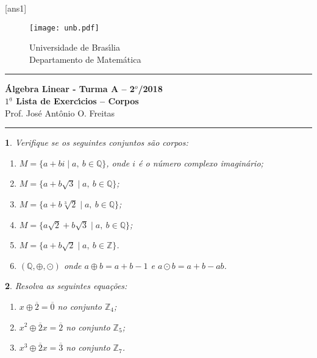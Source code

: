 \documentclass[12pt]{exam}
\newtheorem{exercicio}{}
\newcommand{\integer}{\mathbb{Z}}
\newcommand{\cp}[1]{\mathbb{#1}}
\newcommand{\vesp}[1]{\vspace{ #1  cm}}
\begin{document}
\pagestyle{empty}

[ans1]

\begin{figure}[h]
        \begin{minipage}[c]{1.7cm}
        \texttt{[image: unb.pdf]}
        \end{minipage}%
        \hspace{0pt}
        \begin{minipage}[c]{4in}
          {Universidade de Bras{\'\i}lia} \\
          {Departamento de Matem{\'a}tica}
\end{minipage}
\end{figure}

\vesp{-0.35} \hrule

\begin{center}
{\Large\bf \'Algebra Linear - Turma A -- 2$^{o}$/2018} \\ \vspace{9pt} {\large\bf
  $1^{\underline{a}}$ Lista de Exerc{\'\i}cios -- Corpos}\\ \vspace{9pt} Prof. Jos{\'e} Ant{\^o}nio O. Freitas
\end{center}
\hrule

\vesp{.6}

\begin{exercicio}
Verifique se os seguintes conjuntos s\~ao corpos:
\begin{enumerate}[label={\alph*})]
    \item $M = \{ a + bi \mid a,\ b \in \cp{Q}\}$, onde $i$ \'e o n\'umero complexo imagin\'ario;
    \item $M = \{ a + b\sqrt{3} \mid a,\ b \in \cp{Q}\}$;
    \item $M = \{ a + b\sqrt[3]{2} \mid a,\ b \in \cp{Q}\}$;
    \item $M = \{ a\sqrt{2} + b\sqrt{3} \mid a,\ b \in \cp{Q}\}$;
    \item $M = \{ a + b\sqrt{2} \mid a,\ b \in \cp{Z}\}$.
    \item $(\cp{Q}, \oplus, \odot)$ onde $a \oplus b = a + b - 1$ e $a \odot b = a + b - ab$.
  \end{enumerate}  
\end{exercicio}

\begin{exercicio}
Resolva as seguintes equa\c{c}\~oes:
\begin{enumerate}[label={\alph*})]
  \item $x \oplus \overline{2} = \overline{0}$ no conjunto $\integer_4$;
  \item $x^2 \oplus \overline{2}x = \overline{2}$ no conjunto $\integer_5$;
  \item $x^3 \oplus \overline{2}x = \overline{3}$ no conjunto $\integer_7$.
\end{enumerate}
\end{exercicio}
\end{document}

